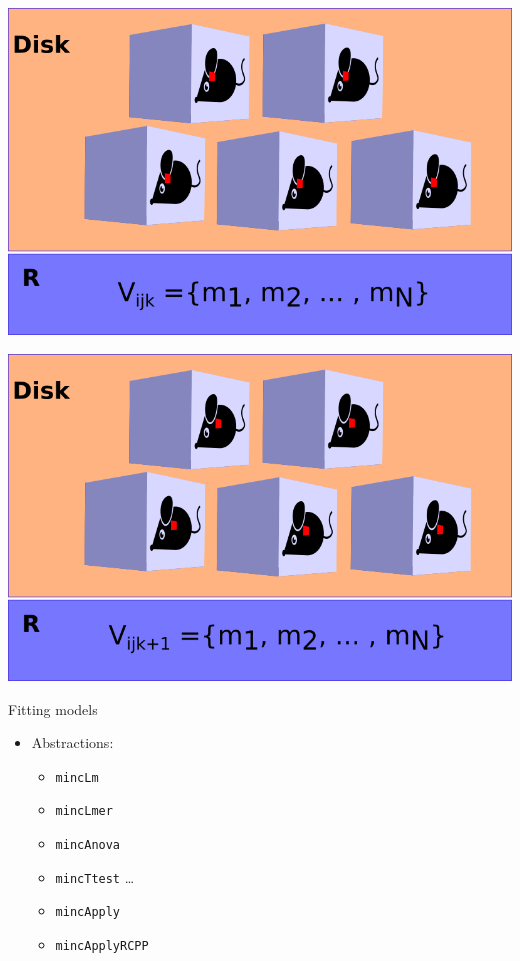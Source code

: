 \begin{frame}

\includegraphics{mouse_vector1.png}

\end{frame}

\begin{frame}

\includegraphics{mouse_vector2.png}

\end{frame}

\begin{frame}{Fitting models}

\begin{itemize}
\tightlist
\item
  Abstractions:

  \begin{itemize}
  \tightlist
  \item
    \texttt{mincLm}
  \item
    \texttt{mincLmer}
  \item
    \texttt{mincAnova}
  \item
    \texttt{mincTtest} \newline
    \ldots{}
  \item
    \texttt{mincApply}
  \item
    \texttt{mincApplyRCPP}
  \end{itemize}
\end{itemize}

\end{frame}

